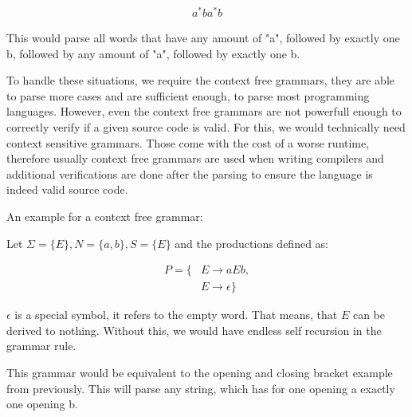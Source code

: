 \begin{align*}
a^*ba^*b
\end{align*}

This would parse all words that have any amount of "a", followed by exactly one b, followed by any amount of "a", followed by exactly one b.

To handle these situations, we require the context free grammars, they are able to parse more cases and are sufficient enough, to parse most programming languages. However, even the context free grammars are not powerfull enough to correctly verify if a given source code is valid. For this, we would technically need context sensitive grammars. Those come with the cost of a worse runtime, therefore usually context free grammars are used when writing compilers and additional verifications are done after the parsing to ensure the language is indeed valid source code.

An example for a context free grammar:

Let $\Sigma = \{E\}, N = \{a, b\}, S = \{E\}$ and the productions defined as:

\begin{align*}
P = \{&E \to a E b,\\
&E \to \epsilon\}
\end{align*}

$\epsilon$ is a special symbol, it refers to the empty word. That means, that $E$ can be derived to nothing. Without this, we would have endless self recursion in the grammar rule.

This grammar would be equivalent to the opening and closing bracket example from previously. This will parse any string, which has for one opening a exactly one opening b.
